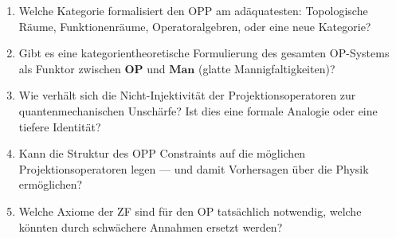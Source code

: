 \documentclass[11pt,a4paper]{article}
\theoremstyle{plain}
\theoremstyle{definition}
\begin{document}
\begin{enumerate}
  \item Welche Kategorie formalisiert den OPP am ad\"{a}quatesten: Topologische
        R\"{a}ume, Funktionenr\"{a}ume, Operatoralgebren, oder eine neue Kategorie?

  \item Gibt es eine kategorientheoretische Formulierung des gesamten OP-Systems
        als Funktor zwischen $\mathbf{OP}$ und $\mathbf{Man}$ (glatte
        Mannigfaltigkeiten)?

  \item Wie verh\"{a}lt sich die Nicht-Injektivit\"{a}t der Projektionsoperatoren zur
        quantenmechanischen Unsch\"{a}rfe? Ist dies eine formale Analogie oder eine
        tiefere Identit\"{a}t?

  \item Kann die Struktur des OPP Constraints auf die m\"{o}glichen
        Projektionsoperatoren legen --- und damit Vorhersagen \"{u}ber die Physik
        erm\"{o}glichen?

  \item Welche Axiome der ZF sind f\"{u}r den OP tats\"{a}chlich notwendig, welche
        k\"{o}nnten durch schw\"{a}chere Annahmen ersetzt werden?
\end{enumerate}
\end{document}
